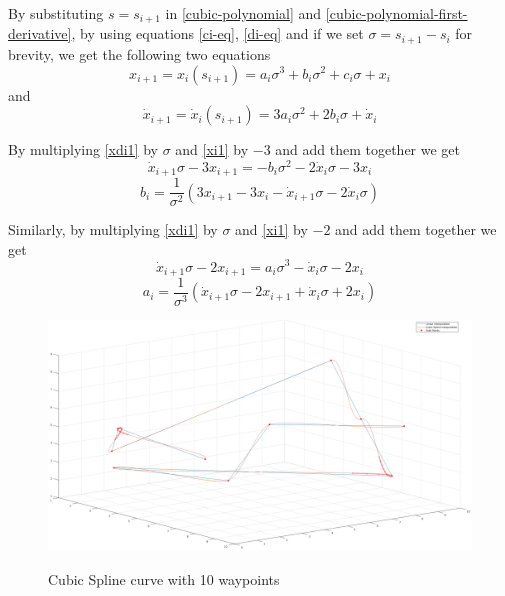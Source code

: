 By substituting $s = s_{i+1}$ in \ref{cubic-polynomial} and \ref{cubic-polynomial-first-derivative}, by using equations \ref{ci-eq}, \ref{di-eq} and if 
we set $σ = s_{i+1}-s_i$ for brevity, we get the following two equations
\begin{equation}
\label{xi1}
x_{i+1} = x_i(s_{i+1}) = a_i σ^3 + b_i σ^2 + c_i σ + x_i
\end{equation}
and
\begin{equation}
\label{xdi1}
\dot{x}_{i+1} = \dot{x}_i(s_{i+1}) = 3a_i σ^2 + 2b_i σ + \dot{x}_i
\end{equation}

By multiplying \ref{xdi1} by $σ$ and \ref{xi1} by $-3$ and add them together we get
\[
\dot{x}_{i+1}σ - 3x_{i+1} = -b_iσ^2 -2\dot{x}_iσ - 3x_i
\]
\begin{equation}
b_i = \frac{1}{σ^2} (3x_{i+1} -3x_i - \dot{x}_{i+1}σ - 2\dot{x}_iσ)
\end{equation}

Similarly, by multiplying \ref{xdi1} by $σ$ and \ref{xi1} by $-2$ and add them together we get
\[
\dot{x}_{i+1}σ - 2x_{i+1} = a_iσ^3 -\dot{x}_iσ - 2x_i
\]
\begin{equation}
a_i = \frac{1}{σ^3} (\dot{x}_{i+1}σ - 2x_{i+1} + \dot{x}_iσ +2x_i)
\end{equation}

\begin{center}
\begin{figure}[H]
\centering
\includegraphics[width=\textwidth]{images/cubic-spline-path1.png}\\
\caption{Cubic Spline curve with 10 waypoints} 
\label{cubic-spline-explanation}
\end{figure}
\end{center}

